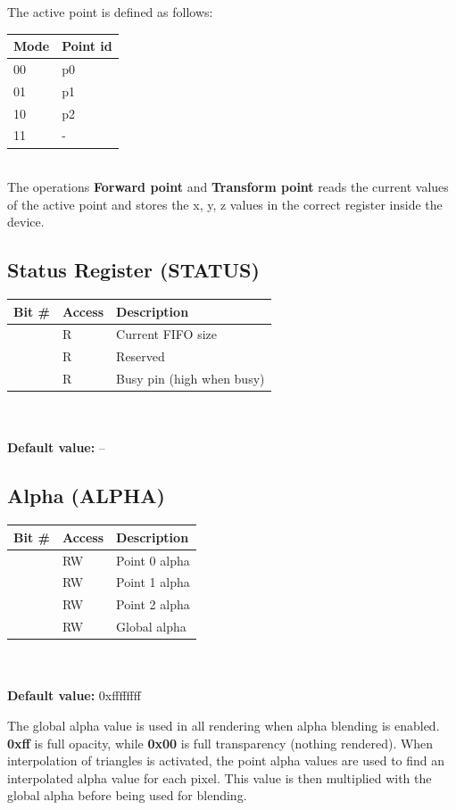 \documentclass[10pt,a4paper]{article}
\begin{document}
The active point is defined as follows:

\begin{tabular}{|l|l|}
\hline \textbf{Mode} & \textbf{Point id}\\ 
\hline
\hline 00 & p0 \\
\hline 01 & p1 \\
\hline 10 & p2 \\
\hline 11 & - \\
\hline 
\end{tabular} \\

The operations \textbf{Forward point} and \textbf{Transform point} reads the current values of the active point and stores the x, y, z values in the correct register inside the device.

\subsection{Status Register (STATUS)}
\begin{tabular}{|l|l|l|}
\hline \textbf{Bit \#} & \textbf{Access} & \textbf{Description} \\ 
\hline
\hline [31:16] & R & Current FIFO size \\
\hline [15:1]  & R & Reserved \\
\hline [0]     & R & Busy pin (high when busy) \\
\hline 
\end{tabular}
\\\\
\textbf{Default value:} --

\subsection{Alpha (ALPHA)}
\begin{tabular}{|l|l|l|}
\hline \textbf{Bit \#} & \textbf{Access} & \textbf{Description} \\ 
\hline
\hline [31:24] & RW & Point 0 alpha \\
\hline [23:16] & RW & Point 1 alpha \\
\hline [15:8] & RW & Point 2 alpha \\
\hline [7:0] & RW & Global alpha \\
\hline 
\end{tabular}
\\\\
\textbf{Default value:} 0xffffffff

The global alpha value is used in all rendering when alpha blending is enabled. \textbf{0xff} is full opacity, while \textbf{0x00} is full transparency (nothing rendered). When interpolation of triangles is activated, the point alpha values are used to find an interpolated alpha value for each pixel. This value is then multiplied with the global alpha before being used for blending.
\end{document}

